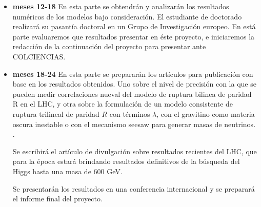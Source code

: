 \begin{itemize}
\item \textbf{meses 12-18} En esta parte se obtendrán y analizarán los
  resultados numéricos de los modelos bajo consideración. El
  estudiante de doctorado realizará su pasantía doctoral en un Grupo
  de Investigación europeo. En está parte evaluaremos que resultados
  presentar en éste proyecto, e iniciaremos la redacción de la
  continuación del proyecto para presentar ante COLCIENCIAS. 

\item \textbf{meses 18-24} En esta parte se prepararán los artículos
  para publicación con base en los resultados obtenidos. Uno sobre el
  nivel de precisión con la que se pueden medir correlaciones nueval
  del modelo de ruptura bilinea de paridad R en el LHC, y otra sobre
  la formulación de un modelo consistente de ruptura trilineal de
  paridad $R$ con términos $\lambda$, con el gravitino como materia
  oscura inestable o con el mecanismo seesaw para generar masas de
  neutrinos. .

  Se escribirá el artículo de divulgación sobre resultados recientes
  del LHC, que para la época estará brindando resultados definitivos
  de la búsqueda del Higgs hasta una masa de 600 GeV.

  Se presentarán los resultados en una conferencia internacional y se
  preparará el informe final del proyecto.
\end{itemize}



